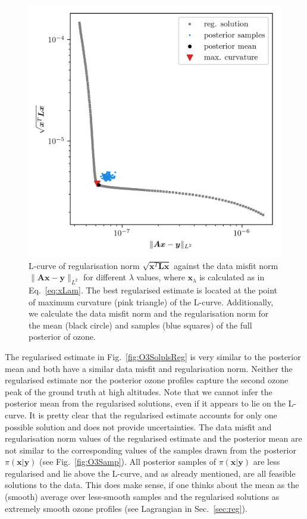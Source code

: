 \begin{figure}[ht!]
	\centering
	\includegraphics{LCurvePhD.png}
	\caption[Plot of the L-curve to find the regularised solution.]{L-curve of regularisation norm $\sqrt{\bm{x}^T\bm{Lx}}$ against the data misfit norm $\lVert \bm{A}\bm{x} - \bm{y} \rVert_{L^2}$ for different $\lambda$ values, where $\bm{x}_{\lambda}$ is calculated as in Eq.~\ref{eq:xLam}. The best regularised estimate is located at the point of maximum curvature (pink triangle) of the L-curve. Additionally, we calculate the data misfit norm and the regularisation norm for the mean (black circle) and samples (blue squares) of the full posterior of ozone.}
	\label{fig:LCurve}
\end{figure}
The regularised estimate in Fig.~\ref{fig:O3SolplsReg} is very similar to the posterior mean and both have a similar data misfit and regularisation norm.
Neither the regularised estimate nor the posterior ozone profiles capture the second ozone peak of the ground truth at high altitudes.
Note that we cannot infer the posterior mean from the regularised solutions, even if it appears to lie on the L-curve.
It is pretty clear that the regularised estimate accounts for only one possible solution and does not provide uncertainties. 
The data misfit and regularisation norm values of the regularised estimate and the posterior mean are not similar to the corresponding values of the samples drawn from the posterior $\pi(\bm{x}| \bm{y})$ (see Fig.~\ref{fig:O3Samp}).
All posterior samples of $\pi(\bm{x}| \bm{y})$ are less regularised and lie above the L-curve, and as already mentioned, are all feasible solutions to the data.
This does make sense, if one thinks about the mean as the (smooth) average over less-smooth samples and the regularised solutions as extremely smooth ozone profiles (see Lagrangian in Sec.~\ref{sec:reg}).

